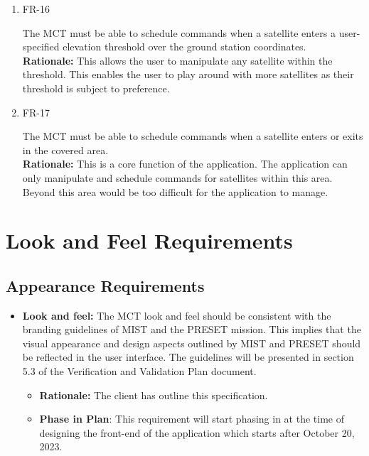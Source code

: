 \documentclass[12pt]{article}
\begin{document}
\begin{enumerate}
    \item{FR-16\\}

    The MCT must be able to schedule commands when a satellite enters a user-specified elevation threshold over the ground station coordinates. \\
    \textbf{Rationale:} This allows the user to manipulate any satellite within the threshold. This enables the user to play around with more satellites as their threshold is subject to preference. 

    \item{FR-17\\}
    
    The MCT must be able to schedule commands when a satellite enters or exits in the covered area. \\
    \textbf{Rationale:} This is a core function of the application. The application can only manipulate and schedule commands for satellites within this area. Beyond this area would be too difficult for the application to manage. 

\end{enumerate}

\section{Look and Feel Requirements}
\subsection{Appearance Requirements}

\begin{itemize}
    \item \textbf{Look and feel:} The MCT look and feel should be consistent with the branding guidelines of MIST and the PRESET mission. This implies that the visual appearance and design aspects outlined by MIST and PRESET should be reflected in the user interface. The guidelines will be presented in section 5.3 of the Verification and Validation Plan document.
    \begin{itemize}
        \item \textbf{Rationale: }The client has outline this specification.
        \item \textbf{Phase in Plan}: This requirement will start phasing in at the time of designing the front-end of the application which starts after October 20, 2023.
    \end{itemize}
\end{itemize}
\end{document}
